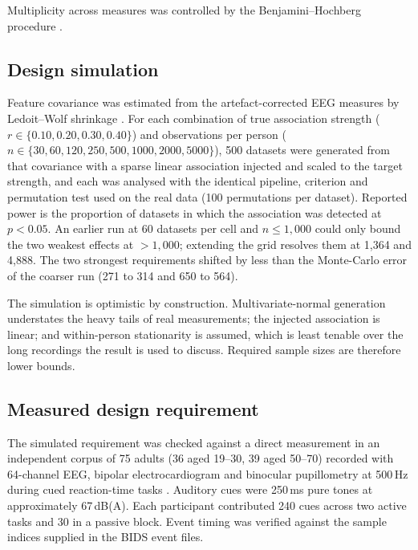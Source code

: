 Multiplicity across measures was controlled by the Benjamini--Hochberg procedure
\citep{benjamini1995}.

\subsection*{Design simulation}

Feature covariance was estimated from the artefact-corrected EEG measures by
Ledoit--Wolf shrinkage \citep{ledoit2004}. For each combination of true association
strength ($r \in \{0.10, 0.20, 0.30, 0.40\}$) and observations per person
($n \in \{30, 60, 120, 250, 500, 1000, 2000, 5000\}$), 500 datasets were generated
from that covariance with a sparse linear association injected and scaled to the
target strength, and each was analysed with the identical pipeline, criterion and
permutation test used on the real data (100 permutations per dataset). Reported
power is the proportion of datasets in which the association was detected at
$p < 0.05$. An earlier run at 60 datasets per cell and $n \le 1{,}000$ could only
bound the two weakest effects at $> 1{,}000$; extending the grid resolves them at
1,364 and 4,888. The two strongest requirements shifted by less than the
Monte-Carlo error of the coarser run (271 to 314 and 650 to 564).

The simulation is optimistic by construction. Multivariate-normal generation
understates the heavy tails of real measurements; the injected association is
linear; and within-person stationarity is assumed, which is least tenable over the
long recordings the result is used to discuss. Required sample sizes are therefore
lower bounds.

\subsection*{Measured design requirement}

The simulated requirement was checked against a direct measurement in an
independent corpus of 75 adults (36 aged 19--30, 39 aged 50--70) recorded with
64-channel EEG, bipolar electrocardiogram and binocular pupillometry at 500\,Hz
during cued reaction-time tasks \citep{ds003690,ribeiro2019erp,ribeiro2019cardiac}.
Auditory cues were 250\,ms pure tones at approximately 67\,dB(A). Each participant
contributed 240 cues across two active tasks and 30 in a passive block. Event
timing was verified against the sample indices supplied in the BIDS event files.

